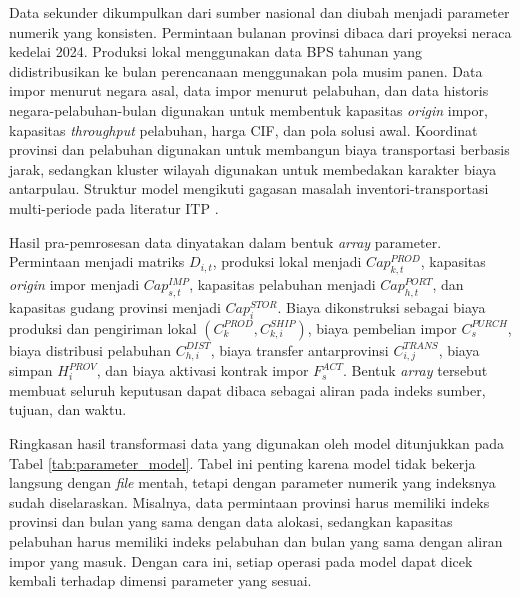 \documentclass[journal]{IEEEtran}
\theoremstyle{definition}
\theoremstyle{definition}
\theoremstyle{plain}
\begin{document}
    Data sekunder dikumpulkan dari sumber nasional dan diubah menjadi parameter numerik yang konsisten. Permintaan bulanan provinsi dibaca dari proyeksi neraca kedelai 2024. Produksi lokal menggunakan data BPS tahunan yang didistribusikan ke bulan perencanaan menggunakan pola musim panen. Data impor menurut negara asal, data impor menurut pelabuhan, dan data historis negara-pelabuhan-bulan digunakan untuk membentuk kapasitas \textit{origin} impor, kapasitas \textit{throughput} pelabuhan, harga CIF, dan pola solusi awal. Koordinat provinsi dan pelabuhan digunakan untuk membangun biaya transportasi berbasis jarak, sedangkan kluster wilayah digunakan untuk membedakan karakter biaya antarpulau. Struktur model mengikuti gagasan masalah inventori-transportasi multi-periode pada literatur ITP \cite{SAINATHUNI2014690,DE2020107566}.

    Hasil pra-pemrosesan data dinyatakan dalam bentuk \textit{array} parameter. Permintaan menjadi matriks $D_{i,t}$, produksi lokal menjadi $Cap^{PROD}_{k,t}$, kapasitas \textit{origin} impor menjadi $Cap^{IMP}_{s,t}$, kapasitas pelabuhan menjadi $Cap^{PORT}_{h,t}$, dan kapasitas gudang provinsi menjadi $Cap^{STOR}_{i}$. Biaya dikonstruksi sebagai biaya produksi dan pengiriman lokal $(C^{PROD}_{k},C^{SHIP}_{k,i})$, biaya pembelian impor $C^{PURCH}_{s}$, biaya distribusi pelabuhan $C^{DIST}_{h,i}$, biaya transfer antarprovinsi $C^{TRANS}_{i,j}$, biaya simpan $H^{PROV}_{i}$, dan biaya aktivasi kontrak impor $F^{ACT}_{s}$. Bentuk \textit{array} tersebut membuat seluruh keputusan dapat dibaca sebagai aliran pada indeks sumber, tujuan, dan waktu.

    Ringkasan hasil transformasi data yang digunakan oleh model ditunjukkan pada Tabel \ref{tab:parameter_model}. Tabel ini penting karena model tidak bekerja langsung dengan \textit{file} mentah, tetapi dengan parameter numerik yang indeksnya sudah diselaraskan. Misalnya, data permintaan provinsi harus memiliki indeks provinsi dan bulan yang sama dengan data alokasi, sedangkan kapasitas pelabuhan harus memiliki indeks pelabuhan dan bulan yang sama dengan aliran impor yang masuk. Dengan cara ini, setiap operasi pada model dapat dicek kembali terhadap dimensi parameter yang sesuai.
\end{document}
